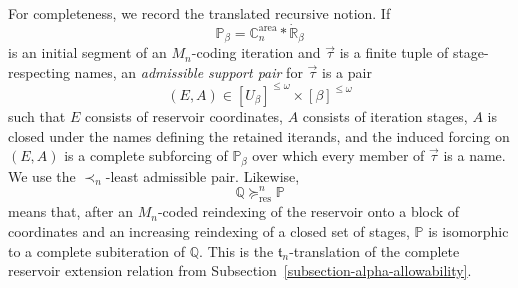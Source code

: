 \documentclass[a4paper,11pt]{article}
\newcommand{\forceP}{\mathbb{P}}
\newcommand{\forceQ}{\mathbb{Q}}
\newcommand{\forceR}{\mathbb{R}}
\newcommand{\forceC}{\mathbb{C}}
\begin{document}
For completeness, we record the translated recursive notion.  If
\[
   \forceP_\beta
   =\forceC^{\mathrm{area}}_n*\dot{\forceR}_\beta
\]
is an initial segment of an $M_n$-coding iteration and $\vec\tau$ is a finite
tuple of stage-respecting names, an \emph{admissible support pair} for
$\vec\tau$ is a pair
\[
   (E,A)\in[U_\beta]^{\leq\omega}\times[\beta]^{\leq\omega}
\]
such that $E$ consists of reservoir coordinates, $A$ consists of iteration
stages, $A$ is closed under
the names defining the retained iterands, and the induced forcing on $(E,A)$
is a complete subforcing of $\forceP_\beta$ over which every member of
$\vec\tau$ is a name.  We use the $\prec_n$-least admissible pair.  Likewise,
\[
   \forceQ\succeq^n_{\mathrm{res}}\forceP
\]
means that, after an $M_n$-coded reindexing of the reservoir onto a block of
coordinates and an increasing reindexing of a closed set of stages,
$\forceP$ is isomorphic to a complete subiteration of $\forceQ$.  This is the
$\mathfrak t_n$-translation of the complete reservoir extension relation from
Subsection~\ref{subsection-alpha-allowability}.
\end{document}
